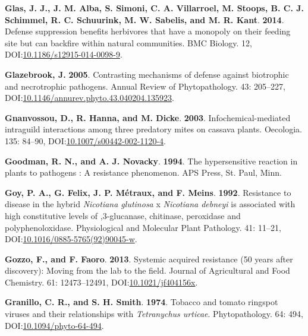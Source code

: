 \documentclass[12pt,final,CPage]{ufthesis}
\newlength{\cslhangindent}
\newenvironment{CSLReferences}[2] %
{%
	\setlength{\parindent}{0pt}
	\ifodd #1 \everypar{\setlength{\hangindent}{\cslhangindent}}\ignorespaces\fi
	\ifnum #2 > 0
	\setlength{\parskip}{#2\baselineskip}
	\fi
}%
{}
\begin{document}
{\begin{CSLReferences}{1}{0}
  \leavevmode{}%
  \textbf{Glas, J. J., J. M. Alba, S. Simoni, C. A. Villarroel, M. Stoops, B. C. J. Schimmel, R. C. Schuurink, M. W. Sabelis, and M. R. Kant}. \textbf{2014}. Defense suppression benefits herbivores that have a monopoly on their feeding site but can backfire within natural communities. {BMC} Biology. 12, DOI:\href{https://doi.org/10.1186/s12915-014-0098-9}{10.1186/s12915-014-0098-9}.

  \leavevmode{}%
  \textbf{Glazebrook, J.} \textbf{2005}. Contrasting mechanisms of defense against biotrophic and necrotrophic pathogens. Annual Review of Phytopathology. 43: 205--227, DOI:\href{https://doi.org/10.1146/annurev.phyto.43.040204.135923}{10.1146/annurev.phyto.43.040204.135923}.

  \leavevmode{}%
  \textbf{Gnanvossou, D., R. Hanna, and M. Dicke}. \textbf{2003}. Infochemical-mediated intraguild interactions among three predatory mites on cassava plants. Oecologia. 135: 84--90, DOI:\href{https://doi.org/10.1007/s00442-002-1120-4}{10.1007/s00442-002-1120-4}.

  \leavevmode{}%
  \textbf{Goodman, R. N., and A. J. Novacky}. \textbf{1994}. The hypersensitive reaction in plants to pathogens : A resistance phenomenon. APS Press, St. Paul, Minn.

  \leavevmode{}%
  \textbf{Goy, P. A., G. Felix, J. P. Métraux, and F. Meins}. \textbf{1992}. Resistance to disease in the hybrid {\emph{Nicotiana glutinosa}} x {\emph{Nicotiana debneyi}} is associated with high constitutive levels of ,3-glucanase, chitinase, peroxidase and polyphenoloxidase. Physiological and Molecular Plant Pathology. 41: 11--21, DOI:\href{https://doi.org/10.1016/0885-5765(92)90045-w}{10.1016/0885-5765(92)90045-w}.

  \leavevmode{}%
  \textbf{Gozzo, F., and F. Faoro}. \textbf{2013}. Systemic acquired resistance (50 years after discovery): Moving from the lab to the field. Journal of Agricultural and Food Chemistry. 61: 12473--12491, DOI:\href{https://doi.org/10.1021/jf404156x}{10.1021/jf404156x}.

  \leavevmode{}%
  \textbf{Granillo, C. R., and S. H. Smith}. \textbf{1974}. Tobacco and tomato ringspot viruses and their relationships with {\emph{Tetranychus urticae}}. Phytopathology. 64: 494, DOI:\href{https://doi.org/10.1094/phyto-64-494}{10.1094/phyto-64-494}.


\end{CSLReferences}}
\end{document}
